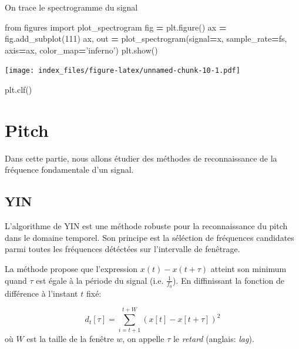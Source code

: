 \documentclass[]{article}
\newenvironment{Shaded}{\begin{snugshade}}{\end{snugshade}}
\newcommand{\DecValTok}[1]{\textcolor[rgb]{0.00,0.00,0.81}{#1}}
\newcommand{\ImportTok}[1]{#1}
\newcommand{\NormalTok}[1]{#1}
\newcommand{\OperatorTok}[1]{\textcolor[rgb]{0.81,0.36,0.00}{\textbf{#1}}}
\newcommand{\StringTok}[1]{\textcolor[rgb]{0.31,0.60,0.02}{#1}}
\begin{document}
\pagebreak

On trace le spectrogramme du signal

\begin{Shaded}
\begin{Highlighting}[]
\ImportTok{from}\NormalTok{ figures }\ImportTok{import}\NormalTok{ plot_spectrogram}
\NormalTok{fig }\OperatorTok{=}\NormalTok{ plt.figure()}
\NormalTok{ax }\OperatorTok{=}\NormalTok{ fig.add_subplot(}\DecValTok{111}\NormalTok{)}
\NormalTok{ax, out }\OperatorTok{=}\NormalTok{ plot_spectrogram(signal}\OperatorTok{=}\NormalTok{x, sample_rate}\OperatorTok{=}\NormalTok{fs, axis}\OperatorTok{=}\NormalTok{ax, color_map}\OperatorTok{=}\StringTok{'inferno'}\NormalTok{)}
\NormalTok{plt.show()}
\end{Highlighting}
\end{Shaded}

\texttt{[image: index\_files/figure-latex/unnamed-chunk-10-1.pdf]}

\begin{Shaded}
\begin{Highlighting}[]
\NormalTok{plt.clf()}
\end{Highlighting}
\end{Shaded}

\hypertarget{pitch}{%
\section{Pitch}\label{pitch}}

Dans cette partie, nous allons étudier des méthodes de reconnaissance de
la fréquence fondamentale d'un signal.

\hypertarget{yin}{%
\subsection{YIN}\label{yin}}

L'algorithme de YIN \emph{\citep{yin}} est une méthode robuste pour la
reconnaissance du pitch dans le domaine temporel. Son principe est la
séléction de fréquences candidates parmi toutes les fréquences détéctées
sur l'intervalle de fenêtrage.

La méthode propose que l'expression \(x(t)-x(t+\tau)\) atteint son
minimum quand \(\tau\) est égale à la période du signal (i.e.
\(\frac{1}{f_0}\)). En diffinissant la fonction de différence à
l'instant \(t\) fixé:

\[ d_t[\tau] = \sum\limits_{i=t+1}^{t+W} \left(x[t]-x[t+\tau]\right)^2 \]
où \(W\) est la taille de la fenêtre \(w\), on appelle \(\tau\) le
\emph{retard} (anglais: \emph{lag}).
\end{document}
